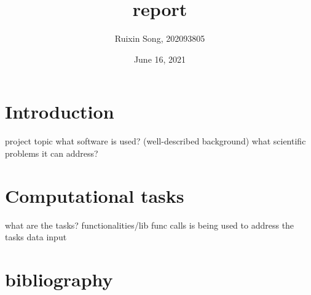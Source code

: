 \documentclass{article}
\title{report}
\author{Ruixin Song, 202093805}
\date{June 16, 2021}
\begin{document}
\maketitle

\section{Introduction}
project topic
what software is used? (well-described background)
what scientific problems it can address?
\section{Computational tasks}
what are the tasks?
functionalities/lib func calls is being used to address the tasks
data input

\section{}
\section{bibliography}
\end{document}
